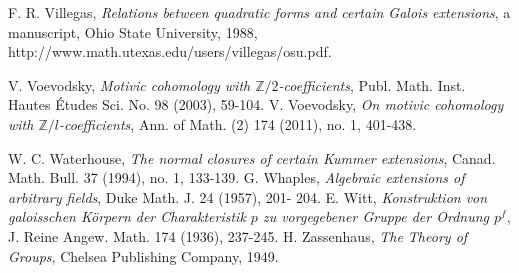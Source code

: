 \documentclass[12pt,leqno]{amsart}
\theoremstyle{plain}
\theoremstyle{definition}
\newcommand{\Z}{{\mathbb Z}}
\begin{document}
\begin{thebibliography}{999999999}
  F. R. Villegas, {\it Relations between quadratic forms and certain Galois extensions}, a manuscript, Ohio State University, 1988,
http://www.math.utexas.edu/users/villegas/osu.pdf.

  V. Voevodsky, {\it Motivic cohomology with $\Z /2$-coefficients},  Publ. Math. Inst. Hautes {\'E}tudes Sci. No. 98 (2003), 59-104. 
  V. Voevodsky, {\it On motivic cohomology with $\Z/l$-coefficients}, Ann. of Math. (2) 174 (2011), no. 1, 401-438. 

 W. C. Waterhouse, {\it The normal closures of certain Kummer extensions}, Canad. Math. Bull. 37 (1994), no. 1, 133-139. 
 G. Whaples, {\it  Algebraic extensions of arbitrary fields}, Duke Math.  J. 24 (1957), 201- 204. 
 E. Witt, {\it Konstruktion von galoisschen K\"{o}rpern der Charakteristik $p$ zu vorgegebener Gruppe der Ordnung $ p^f$}, J. Reine Angew. Math. 174 (1936), 237-245. 
 H. Zassenhaus, {\it The Theory of Groups}, Chelsea Publishing Company, 1949.
\end{thebibliography}
\end{document}
